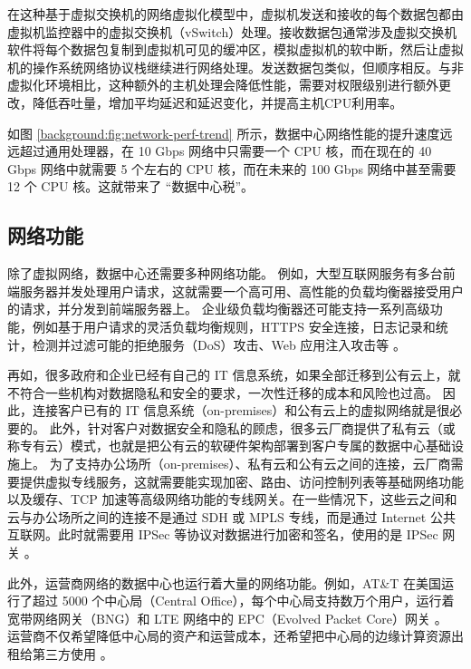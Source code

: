 在这种基于虚拟交换机的网络虚拟化模型中，虚拟机发送和接收的每个数据包都由虚拟机监控器中的虚拟交换机（vSwitch）处理。接收数据包通常涉及虚拟交换机软件将每个数据包复制到虚拟机可见的缓冲区，模拟虚拟机的软中断，然后让虚拟机的操作系统网络协议栈继续进行网络处理。发送数据包类似，但顺序相反。与非虚拟化环境相比，这种额外的主机处理会降低性能，需要对权限级别进行额外更改，降低吞吐量，增加平均延迟和延迟变化，并提高主机CPU利用率。

如图 \ref{background:fig:network-perf-trend} 所示，数据中心网络性能的提升速度远远超过通用处理器，在 10 Gbps 网络中只需要一个 CPU 核，而在现在的 40 Gbps 网络中就需要 5 个左右的 CPU 核，而在未来的 100 Gbps 网络中甚至需要 12 个 CPU 核。这就带来了 ``数据中心税''。

\subsection{网络功能}

除了虚拟网络，数据中心还需要多种网络功能。
例如，大型互联网服务有多台前端服务器并发处理用户请求，这就需要一个高可用、高性能的负载均衡器接受用户的请求，并分发到前端服务器上。
企业级负载均衡器还可能支持一系列高级功能，例如基于用户请求的灵活负载均衡规则，HTTPS 安全连接，日志记录和统计，检测并过滤可能的拒绝服务（DoS）攻击、Web 应用注入攻击等 \cite{ananta}。

再如，很多政府和企业已经有自己的 IT 信息系统，如果全部迁移到公有云上，就不符合一些机构对数据隐私和安全的要求，一次性迁移的成本和风险也过高。
因此，连接客户已有的 IT 信息系统（on-premises）和公有云上的虚拟网络就是很必要的。
此外，针对客户对数据安全和隐私的顾虑，很多云厂商提供了私有云（或称专有云）模式，也就是把公有云的软硬件架构部署到客户专属的数据中心基础设施上。
为了支持办公场所（on-premises）、私有云和公有云之间的连接，云厂商需要提供虚拟专线服务，这就需要能实现加密、路由、访问控制列表等基础网络功能以及缓存、TCP 加速等高级网络功能的专线网关。在一些情况下，这些云之间和云与办公场所之间的连接不是通过 SDH 或 MPLS 专线，而是通过 Internet 公共互联网。此时就需要用 IPSec 等协议对数据进行加密和签名，使用的是 IPSec 网关 \cite{son2017protego}。

此外，运营商网络的数据中心也运行着大量的网络功能。例如，AT\&T 在美国运行了超过 5000 个中心局（Central Office），每个中心局支持数万个用户，运行着宽带网络网关（BNG）和 LTE 网络中的 EPC（Evolved Packet Core）网关 \cite{chang-lan-thesis}。
运营商不仅希望降低中心局的资产和运营成本，还希望把中心局的边缘计算资源出租给第三方使用 \cite{chang-lan-thesis}。

